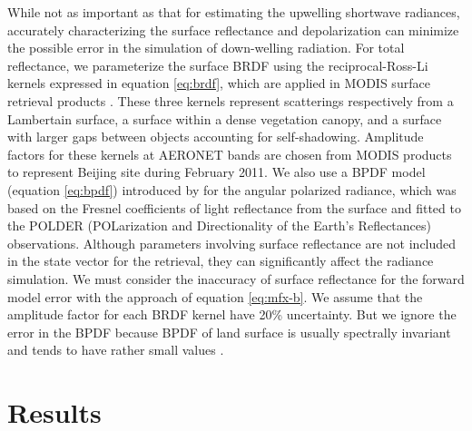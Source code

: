 While not as important as that for estimating the upwelling shortwave
radiances, accurately characterizing the surface reflectance and
depolarization can minimize the possible error in the simulation of
down-welling radiation. For total reflectance, we parameterize the
surface BRDF using the reciprocal-Ross-Li kernels expressed in equation \eqref{eq:brdf},
which are applied in MODIS surface retrieval products \citep{Wanner95, Lucht00}.
These three kernels represent scatterings respectively from a
Lambertain surface, a surface within a dense vegetation canopy, and a
surface with larger gaps between objects accounting for self-shadowing.
Amplitude factors for these kernels at AERONET bands are chosen from
MODIS products to represent Beijing site during February 2011. We also
use a BPDF model (equation \eqref{eq:bpdf}) introduced by
\citet{Maignan09} for the angular
polarized radiance, which was based on the Fresnel coefficients of light
reflectance from the surface and fitted to the POLDER (POLarization
and Directionality of the Earth's Reflectances) observations.
Although parameters involving surface reflectance are not included in
the state vector for the retrieval, they can significantly affect the
radiance simulation. We must consider the inaccuracy of surface
reflectance for the forward model error with the approach of equation
\eqref{eq:mfx-b}. We assume that the amplitude factor for each BRDF kernel have 20\%
uncertainty. But we ignore the error in the BPDF because BPDF of land
surface is usually spectrally invariant and tends to have rather small
values \citep{Nadal99, Maignan09}. 

\section{Results} \label{sec:inforesult}

